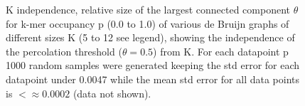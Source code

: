 \documentclass[12pt]{article} \usepackage{simplemargins}
\begin{document}
\begin{figure}

\caption{K independence, relative size of the largest connected component
$\theta$ for k-mer occupancy p (0.0 to 1.0) of various de Bruijn graphs of
different sizes K (5 to 12 see legend), showing the independence of the
percolation threshold ($\theta = 0.5$) from K.
For each datapoint p 1000 random samples were generated keeping the std error
for each datapoint under 0.0047 while the mean std error for all data points is
$< \approx 0.0002$ (data not shown).}
\end{figure}
\end{document}
